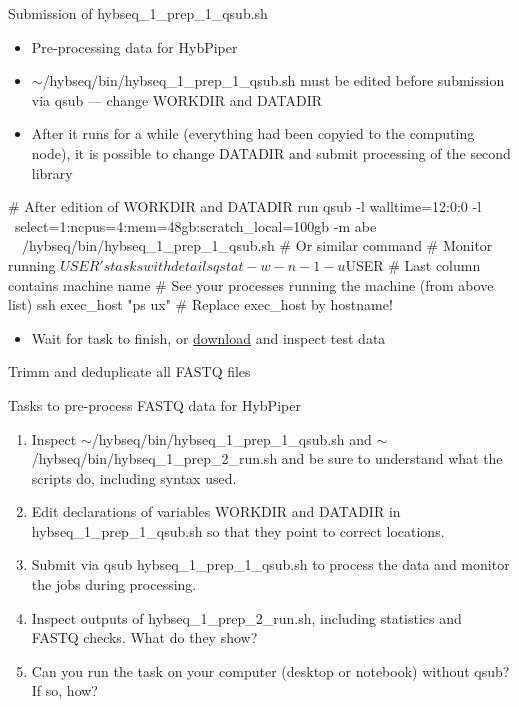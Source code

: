 \documentclass[compress,  xelatex, 11pt, xcolor=x11names, aspectratio=169,
	hyperref={
		bookmarks=true,
		unicode=true,
		colorlinks=true,
		pdftitle={HybSeq course},
		plainpages=false,
		pdfauthor={Vojtech Zeisek},
		pdfsubject={Practical processing of HybSeq target enrichment sequencing data on computing grids like MetaCentrum},
		pdfcreator={XeLaTeX},
		pdfkeywords={BASH, command line, GNU, HybSeq, Linux, MetaCentrum, sequencing shell, target enrichment},
		linkcolor=Turquoise4, %
		anchorcolor=DodgerBlue4, %
		citecolor=DodgerBlue4, %
		filecolor=DodgerBlue4, %
		menucolor=Tan4, %
		urlcolor=DarkOliveGreen4 %
		},
	url={hyphens, lowtilde} %
	]{beamer}
\renewcommand{\texttt}[1]{\colorbox{Cornsilk2}{{\ttfamily #1}}}
\renewcommand{\alert}[1]{\textcolor{OrangeRed3}{#1}}
\begin{document}
\begin{frame}[fragile]{Submission of hybseq\_1\_prep\_1\_qsub.sh}
	\begin{itemize}
		\item Pre-processing data for HybPiper
		\item \alert{\texttt{$\sim$/hybseq/bin/hybseq\_1\_prep\_1\_qsub.sh} must be edited before submission via \texttt{qsub} --- change \texttt{WORKDIR} and \texttt{DATADIR}}
		\item After it runs for a while (everything had been copyied to the computing node), it is possible to change \texttt{DATADIR} and submit processing of the second library
	\end{itemize}
	\begin{bashcode}
    # After edition of WORKDIR and DATADIR run
    qsub -l walltime=12:0:0 -l \
      select=1:ncpus=4:mem=48gb:scratch_local=100gb -m abe \
      ~/hybseq/bin/hybseq_1_prep_1_qsub.sh
    # Or similar command
    # Monitor running $USER's tasks with details
    qstat -w -n -1 -u $USER # Last column contains machine name
    # See your processes running the machine (from above list)
    ssh exec_host "ps ux" # Replace exec_host by hostname!
	\end{bashcode}
	\begin{itemize}
		\item Wait for task to finish, or \href{https://botany.natur.cuni.cz/zeisek/hybseq_course_zingibers_1_prepared.zip}{download} and inspect test data
	\end{itemize}
\end{frame}

\begin{frame}{Trimm and deduplicate all FASTQ files}
	\begin{exampleblock}{Tasks to pre-process FASTQ data for HybPiper}
			\begin{enumerate}
				\item Inspect \texttt{$\sim$/hybseq/bin/hybseq\_1\_prep\_1\_qsub.sh} and \texttt{$\sim$/hybseq/bin/hybseq\_1\_prep\_2\_run.sh} and be sure to understand what the scripts do, including syntax used.
				\item Edit declarations of variables \texttt{WORKDIR} and \texttt{DATADIR} in \texttt{hybseq\_1\_prep\_1\_qsub.sh} so that they point to correct locations.
				\item Submit via \texttt{qsub} \texttt{hybseq\_1\_prep\_1\_qsub.sh} to process the data and monitor the jobs during processing.
				\item Inspect outputs of \texttt{hybseq\_1\_prep\_2\_run.sh}, including statistics and FASTQ checks. What do they show?
				\item Can you run the task on your computer (desktop or notebook) without \texttt{qsub}? If so, how?
		\end{enumerate}
	\end{exampleblock}
\end{frame}
\end{document}
